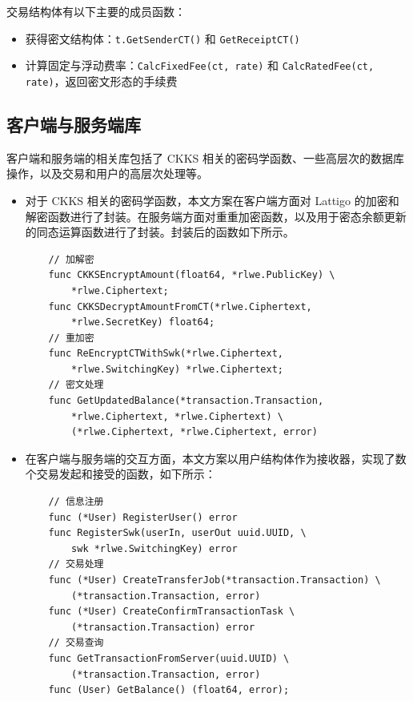 交易结构体有以下主要的成员函数：

\begin{itemize}
    \item 获得密文结构体：\texttt{t.GetSenderCT()} 和 \texttt{GetReceiptCT()}
    \item 计算固定与浮动费率：\texttt{CalcFixedFee(ct, rate)} 和 \texttt{CalcRatedFee(ct, rate)}，返回密文形态的手续费
\end{itemize}


\subsection{客户端与服务端库}

客户端和服务端的相关库包括了 CKKS 相关的密码学函数、一些高层次的数据库操作，以及交易和用户的高层次处理等。

\begin{itemize}
    \item 对于 CKKS 相关的密码学函数，本文方案在客户端方面对 Lattigo 的加密和解密函数进行了封装。在服务端方面对重重加密函数，以及用于密态余额更新的同态运算函数进行了封装。封装后的函数如下所示。
    \begin{verbatim}
    // 加解密
    func CKKSEncryptAmount(float64, *rlwe.PublicKey) \
        *rlwe.Ciphertext;
    func CKKSDecryptAmountFromCT(*rlwe.Ciphertext, 
        *rlwe.SecretKey) float64;
    // 重加密
    func ReEncryptCTWithSwk(*rlwe.Ciphertext, 
        *rlwe.SwitchingKey) *rlwe.Ciphertext;
    // 密文处理
    func GetUpdatedBalance(*transaction.Transaction, 
        *rlwe.Ciphertext, *rlwe.Ciphertext) \
        (*rlwe.Ciphertext, *rlwe.Ciphertext, error)
    \end{verbatim}
    \item 在客户端与服务端的交互方面，本文方案以用户结构体作为接收器，实现了数个交易发起和接受的函数，如下所示：
    \begin{verbatim}
    // 信息注册
    func (*User) RegisterUser() error
    func RegisterSwk(userIn, userOut uuid.UUID, \
        swk *rlwe.SwitchingKey) error
    // 交易处理
    func (*User) CreateTransferJob(*transaction.Transaction) \
        (*transaction.Transaction, error)
    func (*User) CreateConfirmTransactionTask \
        (*transaction.Transaction) error
    // 交易查询
    func GetTransactionFromServer(uuid.UUID) \
        (*transaction.Transaction, error)
    func (User) GetBalance() (float64, error);
    \end{verbatim}
\end{itemize}

